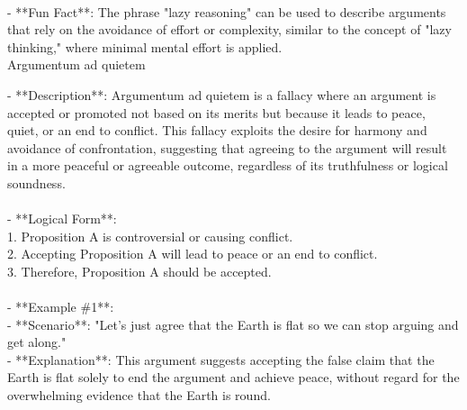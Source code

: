 \documentclass[a4paper,12pt,single,pdftex]{scrartcl}
\begin{document}
    
      
    \\

    
      - **Fun Fact**: The phrase "lazy reasoning" can be used to describe arguments that rely on the avoidance of effort or complexity, similar to the concept of "lazy thinking," where minimal mental effort is applied.
    \\

  

Argumentum ad quietem
    
      - **Description**: Argumentum ad quietem is a fallacy where an argument is accepted or promoted not based on its merits but because it leads to peace, quiet, or an end to conflict. This fallacy exploits the desire for harmony and avoidance of confrontation, suggesting that agreeing to the argument will result in a more peaceful or agreeable outcome, regardless of its truthfulness or logical soundness.
    \\

    
      
    \\

    
      - **Logical Form**:
    \\

    
        1. Proposition A is controversial or causing conflict.
    \\

    
        2. Accepting Proposition A will lead to peace or an end to conflict.
    \\

    
        3. Therefore, Proposition A should be accepted.
    \\

    
      
    \\

    
      - **Example \#1**:
    \\

    
        - **Scenario**: "Let's just agree that the Earth is flat so we can stop arguing and get along."
    \\

    
        - **Explanation**: This argument suggests accepting the false claim that the Earth is flat solely to end the argument and achieve peace, without regard for the overwhelming evidence that the Earth is round.
    \\

    
      
\end{document}
